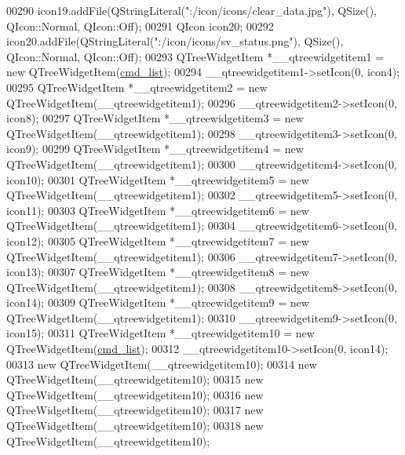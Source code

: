 \begin{DoxyCode}
00290         icon19.addFile(QStringLiteral(\textcolor{stringliteral}{":/icon/icons/clear\_data.jpg"}), QSize(), QIcon::Normal, QIcon::Off);
00291         QIcon icon20;
00292         icon20.addFile(QStringLiteral(\textcolor{stringliteral}{":/icon/icons/sv\_status.png"}), QSize(), QIcon::Normal, QIcon::Off);
00293         QTreeWidgetItem *\_\_qtreewidgetitem1 = \textcolor{keyword}{new} QTreeWidgetItem(\hyperlink{a00080_aa66ece71395b435e915d384fb63bac1d}{cmd\_list});
00294         \_\_qtreewidgetitem1->setIcon(0, icon4);
00295         QTreeWidgetItem *\_\_qtreewidgetitem2 = \textcolor{keyword}{new} QTreeWidgetItem(\_\_qtreewidgetitem1);
00296         \_\_qtreewidgetitem2->setIcon(0, icon8);
00297         QTreeWidgetItem *\_\_qtreewidgetitem3 = \textcolor{keyword}{new} QTreeWidgetItem(\_\_qtreewidgetitem1);
00298         \_\_qtreewidgetitem3->setIcon(0, icon9);
00299         QTreeWidgetItem *\_\_qtreewidgetitem4 = \textcolor{keyword}{new} QTreeWidgetItem(\_\_qtreewidgetitem1);
00300         \_\_qtreewidgetitem4->setIcon(0, icon10);
00301         QTreeWidgetItem *\_\_qtreewidgetitem5 = \textcolor{keyword}{new} QTreeWidgetItem(\_\_qtreewidgetitem1);
00302         \_\_qtreewidgetitem5->setIcon(0, icon11);
00303         QTreeWidgetItem *\_\_qtreewidgetitem6 = \textcolor{keyword}{new} QTreeWidgetItem(\_\_qtreewidgetitem1);
00304         \_\_qtreewidgetitem6->setIcon(0, icon12);
00305         QTreeWidgetItem *\_\_qtreewidgetitem7 = \textcolor{keyword}{new} QTreeWidgetItem(\_\_qtreewidgetitem1);
00306         \_\_qtreewidgetitem7->setIcon(0, icon13);
00307         QTreeWidgetItem *\_\_qtreewidgetitem8 = \textcolor{keyword}{new} QTreeWidgetItem(\_\_qtreewidgetitem1);
00308         \_\_qtreewidgetitem8->setIcon(0, icon14);
00309         QTreeWidgetItem *\_\_qtreewidgetitem9 = \textcolor{keyword}{new} QTreeWidgetItem(\_\_qtreewidgetitem1);
00310         \_\_qtreewidgetitem9->setIcon(0, icon15);
00311         QTreeWidgetItem *\_\_qtreewidgetitem10 = \textcolor{keyword}{new} QTreeWidgetItem(\hyperlink{a00080_aa66ece71395b435e915d384fb63bac1d}{cmd\_list});
00312         \_\_qtreewidgetitem10->setIcon(0, icon14);
00313         \textcolor{keyword}{new} QTreeWidgetItem(\_\_qtreewidgetitem10);
00314         \textcolor{keyword}{new} QTreeWidgetItem(\_\_qtreewidgetitem10);
00315         \textcolor{keyword}{new} QTreeWidgetItem(\_\_qtreewidgetitem10);
00316         \textcolor{keyword}{new} QTreeWidgetItem(\_\_qtreewidgetitem10);
00317         \textcolor{keyword}{new} QTreeWidgetItem(\_\_qtreewidgetitem10);
00318         \textcolor{keyword}{new} QTreeWidgetItem(\_\_qtreewidgetitem10);

\end{DoxyCode}
